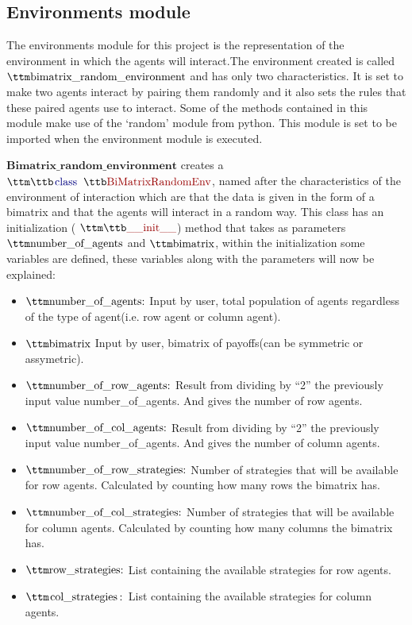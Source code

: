 \subsection{Environments module}
The environments module for this project is the representation of the environment in which the agents will interact.The environment created is called $\pythoninline{bimatrix\_random\_environment}$ and has only two characteristics. It is set to make two agents interact by pairing them randomly and it also sets the rules that these paired agents use to interact. Some of the methods contained in this module make use of the ‘random’ module from python. This module is set to be imported when the environment module is executed. 

$\textbf{Bimatrix\_random\_environment}$ creates a $\pythoninline{class BiMatrixRandomEnv}$, named after the characteristics of the environment of interaction which are that the data is given in the form of a bimatrix and that the agents will interact in a random way. This class has an initialization ( $\pythoninline{\_\_init\_\_}$) method that takes as parameters $\pythoninline{number\_of\_agents}$ and $\pythoninline{bimatrix}$, within the initialization some variables are defined, these variables along with the parameters will now be explained:

\begin{itemize}
\item $\pythoninline{ number\_of\_agents:}$ Input by user, total population of agents regardless of the type of agent(i.e. row agent or column agent).
\item $\pythoninline{bimatrix}$ Input by user, bimatrix of payoffs(can be symmetric or assymetric).
\item $\pythoninline{number\_of\_row\_agents:}$ Result from dividing by “2” the previously input value number\_of\_agents. And gives the number of row agents.
\item $\pythoninline{number\_of\_col\_agents:}$ Result from dividing by “2” the previously input value number\_of\_agents. And gives the number of column agents.
\item $\pythoninline{number\_of\_row\_strategies:}$ Number of strategies that will be available for row agents. Calculated by counting how many rows the bimatrix has.
\item $\pythoninline{number\_of\_col\_strategies:}$ Number of strategies that will be available for column agents. Calculated by counting how many columns the bimatrix has.
\item $\pythoninline{row\_strategies:}$ List containing the available strategies for row agents.
\item $\pythoninline{col\_strategies:}$ List containing the available strategies for column agents.
\end{itemize}

